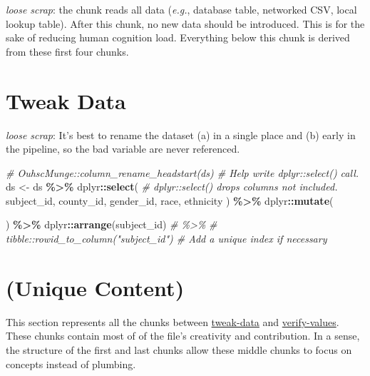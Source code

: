 \documentclass[
]{book}
\newenvironment{Shaded}{\begin{snugshade}}{\end{snugshade}}
\newcommand{\CommentTok}[1]{\textcolor[rgb]{0.56,0.35,0.01}{\textit{#1}}}
\newcommand{\KeywordTok}[1]{\textcolor[rgb]{0.13,0.29,0.53}{\textbf{#1}}}
\newcommand{\NormalTok}[1]{#1}
\newcommand{\OperatorTok}[1]{\textcolor[rgb]{0.81,0.36,0.00}{\textbf{#1}}}
\newcommand{\StringTok}[1]{\textcolor[rgb]{0.31,0.60,0.02}{#1}}
\begin{document}
\emph{loose scrap}:
the chunk reads all data (\emph{e.g.}, database table, networked CSV, local lookup table). After this chunk, no new data should be introduced. This is for the sake of reducing human cognition load. Everything below this chunk is derived from these first four chunks.

\hypertarget{chunk-tweak-data}{%
\section{Tweak Data}\label{chunk-tweak-data}}

\emph{loose scrap}:
It's best to rename the dataset (a) in a single place and (b) early in the pipeline, so the bad variable are never referenced.

\begin{Shaded}
\begin{Highlighting}[]
\CommentTok{\# OuhscMunge::column\_rename\_headstart(ds) \# Help write \textasciigrave{}dplyr::select()\textasciigrave{} call.}
\NormalTok{ds <{-}}
\StringTok{  }\NormalTok{ds }\OperatorTok{\%>\%}
\StringTok{  }\NormalTok{dplyr}\OperatorTok{::}\KeywordTok{select}\NormalTok{(    }\CommentTok{\# \textasciigrave{}dplyr::select()\textasciigrave{} drops columns not included.}
\NormalTok{    subject\_id,}
\NormalTok{    county\_id,}
\NormalTok{    gender\_id,}
\NormalTok{    race,}
\NormalTok{    ethnicity}
\NormalTok{  ) }\OperatorTok{\%>\%}
\StringTok{  }\NormalTok{dplyr}\OperatorTok{::}\KeywordTok{mutate}\NormalTok{(}

\NormalTok{  )  }\OperatorTok{\%>\%}
\StringTok{  }\NormalTok{dplyr}\OperatorTok{::}\KeywordTok{arrange}\NormalTok{(subject\_id) }\CommentTok{\# \%>\%}
  \CommentTok{\# tibble::rowid\_to\_column("subject\_id") \# Add a unique index if necessary}
\end{Highlighting}
\end{Shaded}

\hypertarget{chunk-unique}{%
\section{(Unique Content)}\label{chunk-unique}}

This section represents all the chunks between \protect\hyperlink{chunk-tweak-data}{tweak-data} and \protect\hyperlink{chunk-verify-values}{verify-values}. These chunks contain most of of the file's creativity and contribution. In a sense, the structure of the first and last chunks allow these middle chunks to focus on concepts instead of plumbing.
\end{document}
